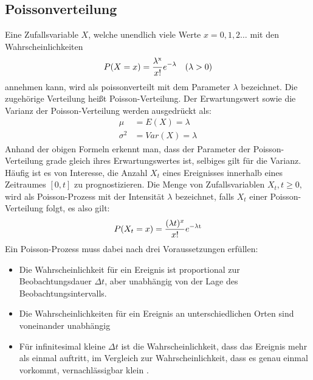 \subsection{Poissonverteilung}
\label{sec.Poissonverteilung}
Eine Zufallsvariable $X$, welche unendlich viele Werte $x=0,1,2\dots$ mit den Wahrscheinlichkeiten
\begin{align}
	P(X=x) &= \frac{\lambda^{\mathrm{x}}}{x!} e^{\mathrm{-\lambda}} & (\lambda >0)
	\label{eq:Poisson Verteilung}
\end{align}
annehmen kann, wird als poissonverteilt mit dem Parameter $\lambda$ bezeichnet. Die zugehörige Verteilung heißt Poisson-Verteilung. Der Erwartungswert sowie die Varianz der Poisson-Verteilung werden ausgedrückt als:
\begin{align}
	\mu &= E(X) = \lambda \\
	\sigma^2 &= Var(X) = \lambda
	\label{eq:Poisson EW und Var}
\end{align}
Anhand der obigen Formeln erkennt man, dass der Parameter der Poisson-Verteilung grade gleich ihres Erwartungswertes ist, selbiges gilt für die Varianz.
Häufig ist es von Interesse, die Anzahl $X_t$ eines Ereignisses innerhalb eines Zeitraumes $[0, t]$ zu prognostizieren. Die Menge von Zufallsvariablen $X_t, t\geq 0,$ wird als Poisson-Prozess mit der Intensität $\lambda$ bezeichnet, falls $X_t$ einer Poisson-Verteilung folgt, es also gilt: \\
\begin{equation}
	P(X_t=x) = \frac{(\lambda t)^x}{x!} e^{\mathrm{-\lambda t}}
	\label{eq:Poisson-Prozess}
\end{equation}
Ein Poisson-Prozess muss dabei nach \cite{Teschl.2014} drei Voraussetzungen erfüllen:
\begin{itemize}
	\item Die Wahrscheinlichkeit für ein Ereignis ist proportional zur Beobachtungsdauer $\Delta t$, aber unabhängig von der Lage des Beobachtungsintervalls.
	\item Die Wahrscheinlichkeiten für ein Ereignis an unterschiedlichen Orten sind voneinander unabhängig
	\item Für infinitesimal kleine $\Delta t$ ist die Wahrscheinlichkeit, dass das Ereignis mehr als einmal auftritt, im Vergleich zur Wahrscheinlichkeit, dass es genau einmal vorkommt, vernachlässigbar klein \cite{Teschl.2014}.
\end{itemize}



